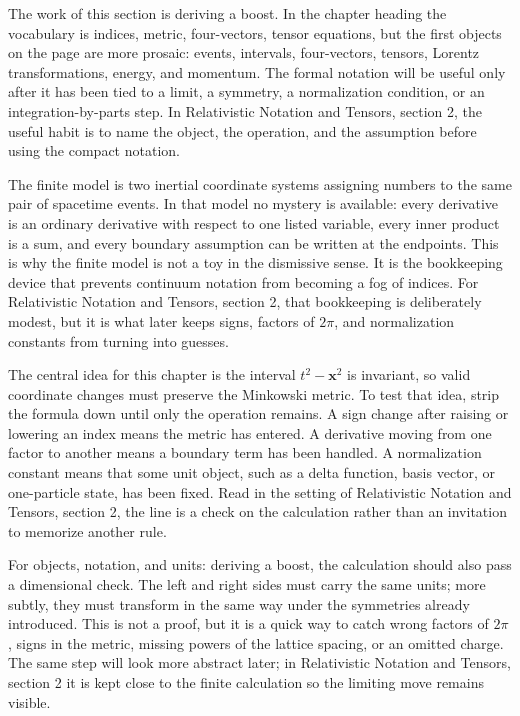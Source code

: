 The work of this section is deriving a boost.  In the chapter heading the vocabulary is indices, metric, four-vectors, tensor equations, but the first objects on the page are more prosaic: events, intervals, four-vectors, tensors, Lorentz transformations, energy, and momentum.  The formal notation will be useful only after it has been tied to a limit, a symmetry, a normalization condition, or an integration-by-parts step.  In Relativistic Notation and Tensors, section 2, the useful habit is to name the object, the operation, and the assumption before using the compact notation.

The finite model is two inertial coordinate systems assigning numbers to the same pair of spacetime events.  In that model no mystery is available: every derivative is an ordinary derivative with respect to one listed variable, every inner product is a sum, and every boundary assumption can be written at the endpoints.  This is why the finite model is not a toy in the dismissive sense.  It is the bookkeeping device that prevents continuum notation from becoming a fog of indices.  For Relativistic Notation and Tensors, section 2, that bookkeeping is deliberately modest, but it is what later keeps signs, factors of \(2\pi\), and normalization constants from turning into guesses.

The central idea for this chapter is the interval \(t^2-\bm x^2\) is invariant, so valid coordinate changes must preserve the Minkowski metric.  To test that idea, strip the formula down until only the operation remains.  A sign change after raising or lowering an index means the metric has entered.  A derivative moving from one factor to another means a boundary term has been handled.  A normalization constant means that some unit object, such as a delta function, basis vector, or one-particle state, has been fixed.  Read in the setting of Relativistic Notation and Tensors, section 2, the line is a check on the calculation rather than an invitation to memorize another rule.

For objects, notation, and units: deriving a boost, the calculation should also pass a dimensional check.  The left and right sides must carry the same units; more subtly, they must transform in the same way under the symmetries already introduced.  This is not a proof, but it is a quick way to catch wrong factors of \(2\pi\), signs in the metric, missing powers of the lattice spacing, or an omitted charge.  The same step will look more abstract later; in Relativistic Notation and Tensors, section 2 it is kept close to the finite calculation so the limiting move remains visible.

